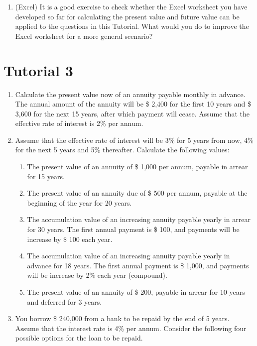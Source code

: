 \documentclass[
]{book}
\providecommand{\tightlist}{%
  \setlength{\itemsep}{0pt}\setlength{\parskip}{0pt}}
\theoremstyle{definition}
\theoremstyle{definition}
\theoremstyle{definition}
\theoremstyle{definition}
\theoremstyle{remark}
\begin{document}
\begin{enumerate}
\def\labelenumi{\arabic{enumi}.}
\setcounter{enumi}{4}
\tightlist
\item
  (Excel) It is a good exercise to check whether the Excel worksheet
  you have developed so far for calculating the present value and
  future value can be applied to the questions in this Tutorial. What
  would you do to improve the Excel worksheet for a more general
  scenario?
\end{enumerate}

\section{Tutorial 3}\label{tutorial-3}

\begin{enumerate}
\def\labelenumi{\arabic{enumi}.}
\item
  Calculate the present value now of an annuity payable monthly in
  advance. The annual amount of the annuity will be \$ 2,400 for the
  first 10 years and \$ 3,600 for the next 15 years, after which
  payment will cease. Assume that the effective rate of interest is 2\%
  per annum.
\item
  Assume that the effective rate of interest will be 3\% for 5 years
  from now, 4\% for the next 5 years and 5\% thereafter. Calculate the
  following values:

  \begin{enumerate}
  \def\labelenumii{\arabic{enumii}.}
  \item
    The present value of an annuity of \$ 1,000 per annum, payable
    in arrear for 15 years.
  \item
    The present value of an annuity due of \$ 500 per annum, payable
    at the beginning of the year for 20 years.
  \item
    The accumulation value of an increasing annuity payable yearly
    in arrear for 30 years. The first annual payment is \$ 100, and
    payments will be increase by \$ 100 each year.
  \item
    The accumulation value of an increasing annuity payable yearly
    in advance for 18 years. The first annual payment is \$ 1,000,
    and payments will be increase by 2\% each year (compound).
  \item
    The present value of an annuity of \$ 200, payable in arrear for
    10 years and deferred for 3 years.
  \end{enumerate}
\item
  You borrow \$ 240,000 from a bank to be repaid by the end of 5
  years. Assume that the interest rate is 4\% per annum. Consider the
  following four possible options for the loan to be repaid.


\end{enumerate}
\end{document}
